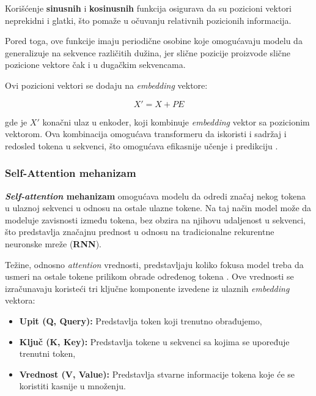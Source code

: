 \documentclass[12pt]{article}
\begin{document}
   Korišćenje \textbf{sinusnih} i \textbf{kosinusnih} funkcija osigurava da su pozicioni vektori
   neprekidni i glatki, što pomaže u očuvanju relativnih pozicionih informacija. 
   
   Pored toga, ove funkcije imaju periodične osobine koje omogućavaju modelu da 
   generalizuje na sekvence različitih dužina, jer slične pozicije proizvode slične 
   pozicione vektore čak i u dugačkim sekvencama.

   Ovi pozicioni vektori se dodaju na \textit{embedding} vektore:

   \[
   X' = X + PE
   \]

   gde je \(X'\) konačni ulaz u enkoder, koji kombinuje \textit{embedding} vektor 
   sa pozicionim vektorom. Ova kombinacija omogućava transformeru da 
   iskoristi i sadržaj i redosled tokena u sekvenci, što omogućava efikasnije 
   učenje i predikciju \cite{attentionneed}.

   \subsubsection*{Self-Attention mehanizam}
   \textbf{\textit{Self-attention} mehanizam} \cite{attentionneed} omogućava modelu da odredi značaj nekog 
   tokena u ulaznoj sekvenci u odnosu na ostale ulazne tokene. 
   Na taj način model može da modeluje zavisnosti između tokena, bez obzira na 
   njihovu udaljenost u sekvenci, što predstavlja značajnu prednost u odnosu na 
   tradicionalne rekurentne neuronske mreže (\textbf{RNN}).
 
   Težine, odnosno \textit{attention} vrednosti, predstavljaju koliko fokusa model treba 
   da usmeri na ostale tokene prilikom obrade određenog tokena \cite{trans_exp}. 
   Ove vrednosti se izračunavaju koristeći tri ključne komponente izvedene 
   iz ulaznih \textit{embedding} vektora:

   \begin{itemize}
      \item \textbf{Upit (Q, Query):} Predstavlja token koji trenutno obrađujemo,
      \item \textbf{Ključ (K, Key):} Predstavlja tokene u sekvenci sa kojima 
      se upoređuje trenutni token,
      \item \textbf{Vrednost (V, Value):} Predstavlja stvarne informacije tokena koje 
      će se koristiti kasnije u množenju.
  \end{itemize}
  
  \newpage
\end{document}
